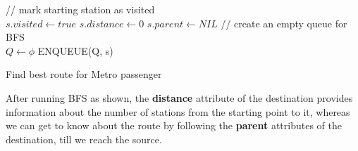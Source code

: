 \documentclass[12pt]{report}
\begin{document}
\begin{algorithm}[H]
	\SetAlgoLined
	// mark starting station as visited \\
	$s.visited \gets true $ \;
	$s.distance \gets 0 $ \;
	$s.parent \gets NIL $\;
	// create an empty queue for BFS \\
	$Q \gets \phi $ \;
	ENQUEUE(Q, s) \;
	\caption{Find best route for Metro passenger}	
\end{algorithm}

After running BFS as shown, the \textbf{distance} attribute of the destination provides information about the number of stations from the starting point to it, whereas we can get to know about the route by following the \textbf{parent} attributes of the destination, till we reach the source. 
\\
\end{document}
